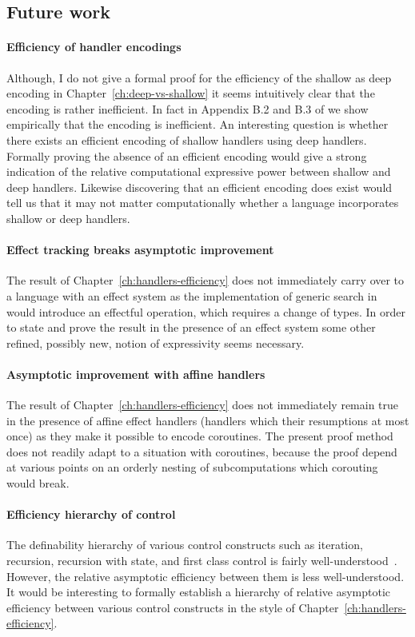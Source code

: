 \documentclass[12pt,phd,lfcs,twoside,openright,logo,leftchapter,normalheadings]{infthesis}
\theoremstyle{plain}
\theoremstyle{definition}
\begin{document}
\subsection{Future work}

\paragraph{Efficiency of handler encodings} Although, I do not give a
formal proof for the efficiency of the shallow as deep encoding in
Chapter~\ref{ch:deep-vs-shallow} it seems intuitively clear that the
encoding is rather inefficient. In fact in Appendix B.2 and B.3 of
\citet{HillerstromL18} we show empirically that the encoding is
inefficient. An interesting question is whether there exists an
efficient encoding of shallow handlers using deep handlers. Formally
proving the absence of an efficient encoding would give a strong
indication of the relative computational expressive power between
shallow and deep handlers. Likewise discovering that an efficient
encoding does exist would tell us that it may not matter
computationally whether a language incorporates shallow or deep
handlers.

\paragraph{Effect tracking breaks asymptotic improvement} The
result of Chapter~\ref{ch:handlers-efficiency} does not immediately
carry over to a language with an effect system as the implementation
of generic search in \HPCF{} would introduce an effectful operation,
which requires a change of types. In order to state and prove the
result in the presence of an effect system some other refined,
possibly new, notion of expressivity seems necessary.

\paragraph{Asymptotic improvement with affine handlers}
The result of Chapter~\ref{ch:handlers-efficiency} does not
immediately remain true in the presence of affine effect handlers
(handlers which their resumptions at most once) as they make it
possible to encode coroutines. The present proof method does not
readily adapt to a situation with coroutines, because the proof depend
at various points on an orderly nesting of subcomputations which
corouting would break.

\paragraph{Efficiency hierarchy of control} The definability hierarchy
of various control constructs such as iteration, recursion, recursion
with state, and first class control is fairly
well-understood~\cite{LongleyN15,Longley18a,Longley19}. However, the
relative asymptotic efficiency between them is less
well-understood. It would be interesting to formally establish a
hierarchy of relative asymptotic efficiency between various control
constructs in the style of Chapter~\ref{ch:handlers-efficiency}.


\singlespace



\end{document}
